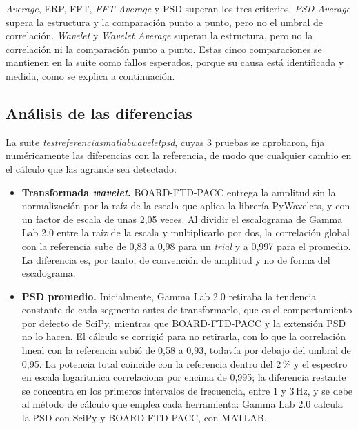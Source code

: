 \documentclass[12pt,letterpaper,oneside]{article}
\DeclareRobustCommand{\_}{\textunderscore\allowbreak}
\begin{document}
\textit{Average}, ERP, FFT, \textit{FFT Average} y PSD superan los tres criterios. \textit{PSD Average} supera la estructura y la comparación punto a punto, pero no el umbral de correlación. \textit{Wavelet} y \textit{Wavelet Average} superan la estructura, pero no la correlación ni la comparación punto a punto. Estas cinco comparaciones se mantienen en la suite como fallos esperados, porque su causa está identificada y medida, como se explica a continuación.

\subsection{Análisis de las diferencias}
\label{sec:td_diferencias}
La suite \textit{test\_referencias\_matlab\_wavelet\_psd}, cuyas 3 pruebas se aprobaron, fija numéricamente las diferencias con la referencia, de modo que cualquier cambio en el cálculo que las agrande sea detectado:

\begin{itemize}
    \item \textbf{Transformada \textit{wavelet}.} BOARD-FTD-PACC entrega la amplitud sin la normalización por la raíz de la escala que aplica la librería PyWavelets, y con un factor de escala de unas 2,05 veces. Al dividir el escalograma de Gamma Lab 2.0 entre la raíz de la escala y multiplicarlo por dos, la correlación global con la referencia sube de 0,83 a 0,98 para un \textit{trial} y a 0,997 para el promedio. La diferencia es, por tanto, de convención de amplitud y no de forma del escalograma.
    \item \textbf{PSD promedio.} Inicialmente, Gamma Lab 2.0 retiraba la tendencia constante de cada segmento antes de transformarlo, que es el comportamiento por defecto de SciPy, mientras que BOARD-FTD-PACC y la extensión PSD no lo hacen. El cálculo se corrigió para no retirarla, con lo que la correlación lineal con la referencia subió de 0,58 a 0,93, todavía por debajo del umbral de 0,95. La potencia total coincide con la referencia dentro del 2\,\% y el espectro en escala logarítmica correlaciona por encima de 0,995; la diferencia restante se concentra en los primeros intervalos de frecuencia, entre 1 y 3\,Hz, y se debe al método de cálculo que emplea cada herramienta: Gamma Lab 2.0 calcula la PSD con SciPy y BOARD-FTD-PACC, con MATLAB.
\end{itemize}
\end{document}
